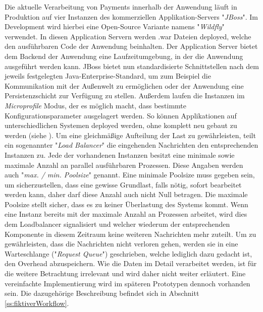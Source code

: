 Die aktuelle Verarbeitung von Payments innerhalb der Anwendung läuft in Produktion auf vier Instanzen des kommerziellen Applikation-Servers "\emph{JBoss}". Im Development wird hierbei eine Open-Source Variante namens "\emph{Wildfly}" verwendet. In diesen Application Servern werden .war Dateien deployed, welche den ausführbaren Code der Anwendung beinhalten. Der Application Server bietet dem Backend der Anwendung eine Laufzeitumgebung, in der die Anwendung ausgeführt werden kann. JBoss bietet nun standardisierte Schnittstellen nach dem jeweils festgelegten Java-Enterprise-Standard, um zum Beispiel die Kommunikation mit der Außenwelt zu ermöglichen oder der Anwendung eine Persistenzschicht zur Verfügung zu stellen. Außerdem laufen die Instanzen im \emph{Microprofile} Modus, der es möglich macht, dass bestimmte Konfigurationsparameter ausgelagert werden. So können Applikationen auf unterschiedlichen Systemen deployed werden, ohne komplett neu gebaut zu werden (siehe \cite{microprofile}). Um eine gleichmäßige Aufteilung der Last zu gewährleisten, teilt ein sogenannter "\emph{Load Balancer}" die eingehenden Nachrichten den entsprechenden Instanzen zu. Jede der vorhandenen Instanzen besitzt eine minimale sowie maximale Anzahl an parallel ausführbaren Prozessen. Diese Angaben werden auch "\emph{max. / min. Poolsize}" genannt. Eine minimale Poolsize muss gegeben sein, um sicherzustellen, dass eine gewisse Grundlast, falls nötig, sofort bearbeitet werden kann, daher darf diese Anzahl auch nicht Null betragen. Die maximale Poolsize stellt sicher, dass es zu keiner Überlastung des Systems kommt. Wenn eine Instanz bereits mit der maximale Anzahl an Prozessen arbeitet, wird dies dem Loadbalancer signalisiert und welcher wiederum der entsprechenden Komponente in diesem Zeitraum keine weiteren Nachrichten mehr zuteilt. Um zu gewährleisten, dass die Nachrichten nicht verloren gehen, werden sie in eine Warteschlange ("\emph{Request Queue}") geschrieben, welche lediglich dazu gedacht ist, den Overhead abzuspeichern. Wie die Daten im Detail verarbeitet werden, ist für die weitere Betrachtung irrelevant und wird daher nicht weiter erläutert. Eine vereinfachte Implementierung wird im späteren Prototypen dennoch vorhanden sein. Die dazugehörige Beschreibung befindet sich in Abschnitt \ref{ss:fiktiverWorkflow}.



